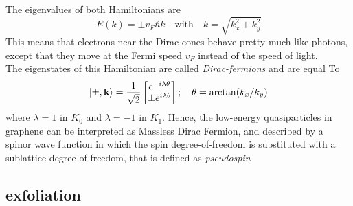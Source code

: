 The eigenvalues of both Hamiltonians are 
\begin{equation}
    E(k)=\pm v_F\hbar k \quad\text{with}\quad k=\sqrt{k_x^2+k_y^2}
\end{equation}
This means that electrons near the Dirac cones behave pretty much like photons, except that they move at the Fermi speed $v_F$ instead of the speed of light.\\
The eigenstates of this Hamiltonian are called \textit{Dirac-fermions} and are equal To
\begin{equation}
    \ket{\pm,\mathbf{k}}=\frac 1{\sqrt 2}
    \begin{bmatrix}
        e^{-i\lambda\theta}\\
        \pm e^{i\lambda\theta}
    \end{bmatrix};\quad \theta=\arctan(k_x/k_y)
\end{equation}
where $\lambda=1$ in $K_0$ and $\lambda=-1$ in $K_1$. Hence, the low-energy quasiparticles in graphene can be interpreted as Massless Dirac Fermion, and described by a spinor wave function in which the spin degree-of-freedom is substituted with a sublattice degree-of-freedom, that is defined as \textit{pseudospin}

\subsection*{exfoliation}
